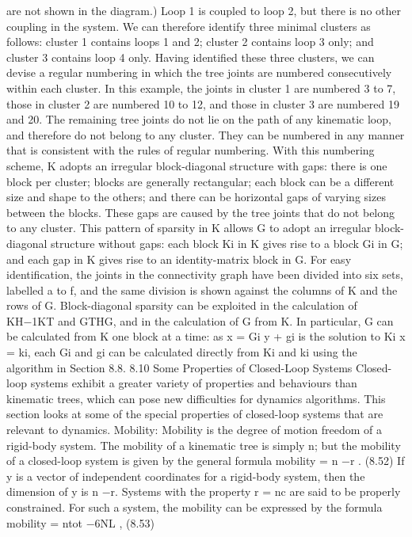 are not shown in the diagram.) Loop 1 is coupled to loop 2, but there is no other coupling in the system. We can therefore identify three minimal clusters as follows: cluster 1 contains loops 1 and 2; cluster 2 contains loop 3 only; and cluster 3 contains loop 4 only. Having identified these three clusters, we can devise a regular numbering in which the tree joints are numbered consecutively within each cluster. In this example, the joints in cluster 1 are numbered 3 to 7, those in cluster 2 are numbered 10 to 12, and those in cluster 3 are numbered 19 and 20. The remaining tree joints do not lie on the path of any kinematic loop, and therefore do not belong to any cluster. They can be numbered in any manner that is consistent with the rules of regular numbering. With this numbering scheme, K adopts an irregular block-diagonal structure with gaps: there is one block per cluster; blocks are generally rectangular; each block can be a different size and shape to the others; and there can be horizontal gaps of varying sizes between the blocks. These gaps are caused by the tree joints that do not belong to any cluster. This pattern of sparsity in K allows G to adopt an irregular block-diagonal structure without gaps: each block Ki in K gives rise to a block Gi in G; and each gap in K gives rise to an identity-matrix block in G. For easy identification, the joints in the connectivity graph have been divided into six sets, labelled a to f, and the same division is shown against the columns of K and the rows of G. Block-diagonal sparsity can be exploited in the calculation of KH−1KT and GTHG, and in the calculation of G from K. In particular, G can be calculated from K one block at a time: as x = Gi y + gi is the solution to Ki x = ki, each Gi and gi can be calculated directly from Ki and ki using the algorithm in Section 8.8. 8.10 Some Properties of Closed-Loop Systems Closed-loop systems exhibit a greater variety of properties and behaviours than kinematic trees, which can pose new difficulties for dynamics algorithms. This section looks at some of the special properties of closed-loop systems that are relevant to dynamics. Mobility: Mobility is the degree of motion freedom of a rigid-body system. The mobility of a kinematic tree is simply n; but the mobility of a closed-loop system is given by the general formula mobility = n −r . (8.52) If y is a vector of independent coordinates for a rigid-body system, then the dimension of y is n −r. Systems with the property r = nc are said to be properly constrained. For such a system, the mobility can be expressed by the formula mobility = ntot −6NL , (8.53)


